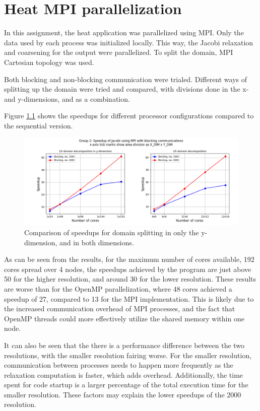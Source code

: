\chapter{Heat MPI parallelization}


In this assignment, the heat application was parallelized using MPI. Only the data used by each process was initialized locally. This way, the Jacobi relaxation and coarsening for the output were parallelized. To split the domain, MPI Cartesian topology was used. 

Both blocking and non-blocking communication were trialed. Different ways of splitting up the domain were tried and compared, with divisions done in the x- and y-dimensions, and as a combination.

Figure \ref{fig:speedups-mpi-1d2d} shows the speedups for different processor configurations compared to the sequential version.

\begin{figure}[h]
    \centering
    \includegraphics[scale=0.55]{figures/group2_jacobiMPI_1d_2d.png}
    \caption{Comparison of speedups for domain splitting in only the y-dimension, and in both dimensions.}
    \label{fig:speedups-mpi-1d2d}
\end{figure}

As can be seen from the results, for the maximum number of cores available, 192 cores spread over 4 nodes, the speedups achieved by the program are just above 50 for the higher resolution, and around 30 for the lower resolution. These results are worse than for the OpenMP parallelization, where 48 cores achieved a speedup of 27, compared to 13 for the MPI implementation. This is likely due to the increased communication overhead of MPI processes, and the fact that OpenMP threads could more effectively utilize the shared memory within one node.

It can also be seen that the there is a performance difference between the two resolutions, with the smaller resolution fairing worse. For the smaller resolution, communication between processes needs to happen more frequently as the relaxation computation is faster, which adds overhead. Additionally, the time spent for code startup is a larger percentage of the total execution time for the smaller resolution. These factors may explain the lower speedups of the 2000 resolution.

